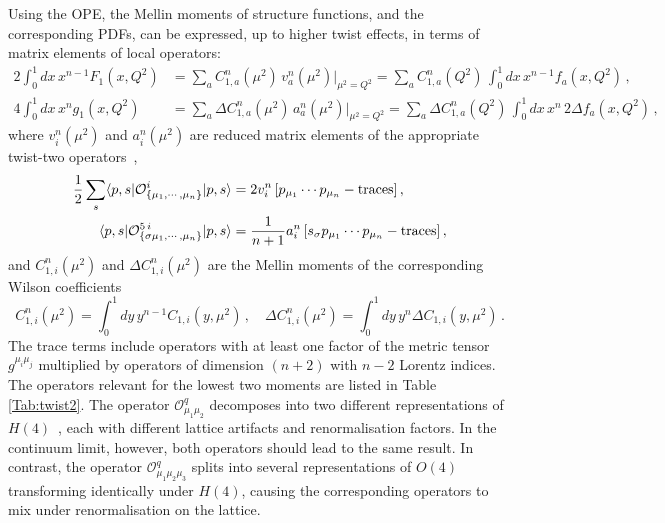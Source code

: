 Using the OPE, the Mellin moments of structure functions, and the corresponding PDFs, can be expressed, up to higher twist effects, in terms of matrix elements of local operators:
\begin{align}
\!\!\!2 \int_0^1 dx\, x^{n-1} F_1(x,Q^2) &= \sum_a C_{1,a}^n(\mu^2)\, v_a^n(\mu^2)|_{\mu^2=Q^2} = \sum_a C_{1,a}^n(Q^2)\, \int_0^1 dx\, x^{n-1} f_a(x,Q^2)\,,\\
4 \int_0^1 dx\, x^n g_1(x,Q^2) &= \sum_a \Delta C_{1,a}^n(\mu^2)\, a_a^n(\mu^2)|_{\mu^2=Q^2} = \sum_a \Delta C_{1,a}^n(Q^2)\, \int_0^1 dx\, x^n\, 2 \Delta f_a(x,Q^2)\,,
\end{align}
where $v_i^n(\mu^2)$ and $a_i^n(\mu^2)$ are reduced matrix elements of the appropriate twist-two operators~\cite{Gockeler:1995wg},
\begin{align}
\frac{1}{2} \sum_s \langle p,s|\mathcal{O}^i_{\{\mu_1,\cdots,\mu_n\}}|p,s\rangle = {} & 2 v_i^n\, [p_{\mu_1}\cdots p_{\mu_n} - {\rm traces}] \,, \label{eq:twist2me}\\
\langle p,s|\mathcal{O}^{5\,i}_{\{\sigma \mu_1,\cdots,\mu_n\}}|p,s\rangle = {} & \frac{1}{n+1} a_i^n\, [s_\sigma p_{\mu_1}\cdots p_{\mu_n} - {\rm traces}]\,,
\end{align}
and $C_{1,i}^n(\mu^2)$ and $\Delta C_{1,i}^n(\mu^2)$ are the Mellin moments of the corresponding Wilson coefficients
\begin{equation}
C_{1,i}^n(\mu^2) = \int_0^1 dy\, y^{n-1} C_{1,i}(y,\mu^2)\,, \quad
\Delta C_{1,i}^n(\mu^2) = \int_0^1 dy\, y^n \Delta C_{1,i}(y,\mu^2)\,.
\end{equation}
The trace terms include operators with at least one factor of the metric tensor $g^{\mu_i \mu_j}$ multiplied by
operators of dimension $(n+2)$ with $n-2$ Lorentz indices. The operators relevant for the lowest two moments are listed in Table \ref{Tab:twist2}. The operator $\mathcal{O}^q_{\mu_1\mu_2}$ decomposes into two different representations of $H(4)$~\cite{Gockeler:1996mu}, each with different lattice artifacts and renormalisation factors. In the continuum limit, however, both operators should lead to the same result. In contrast, the operator $\mathcal{O}^q_{\mu_1\mu_2\mu_3}$ 
splits into several representations of $O(4)$ transforming identically 
under $H(4)$, causing the corresponding operators to mix under renormalisation 
on the lattice.

